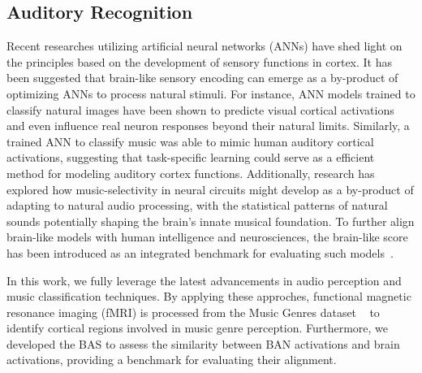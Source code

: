 \par


\subsection{Auditory Recognition}

Recent researches utilizing artificial neural networks (ANNs) have shed light on the principles based on the development of sensory functions in cortex\cite{richards2019deep,hassabis2017neuroscience,kell2019deep,saxe2021if}. 
It has been suggested that brain-like sensory encoding can emerge as a by-product of optimizing ANNs to process natural stimuli.
For instance, ANN models trained to classify natural images have been shown to predicte visual cortical activations and even influence real neuron responses beyond their natural limits\cite{cadieu2014deep,yamins2014performance,bashivan2018neural}. 
Similarly, a trained ANN to classify music was able to mimic human auditory cortical activations\cite{kell2018task}, suggesting that task-specific learning could serve as a efficient method for modeling auditory cortex functions. 
Additionally, research has explored how music-selectivity in neural circuits might develop as a by-product of adapting to natural audio processing\cite{hauser2003evolution,trainor2015origins,honing2015without,mlynarski2019ecological}, with the statistical patterns of natural sounds potentially shaping the brain’s innate musical foundation. 
To further align brain-like models with human intelligence and neurosciences, the brain-like score has been introduced as an integrated benchmark for evaluating such models~\cite{schrimpf2020integrative}.


In this work, we fully leverage the latest advancements in audio perception and music classification techniques. 
By applying these approches,  functional magnetic resonance imaging (fMRI) is processed from the Music Genres dataset ~\cite{nakai2022music} to identify cortical regions involved in music genre perception. 
Furthermore, we developed the BAS to assess the similarity between BAN activations and brain activations, providing a benchmark for evaluating their alignment.



